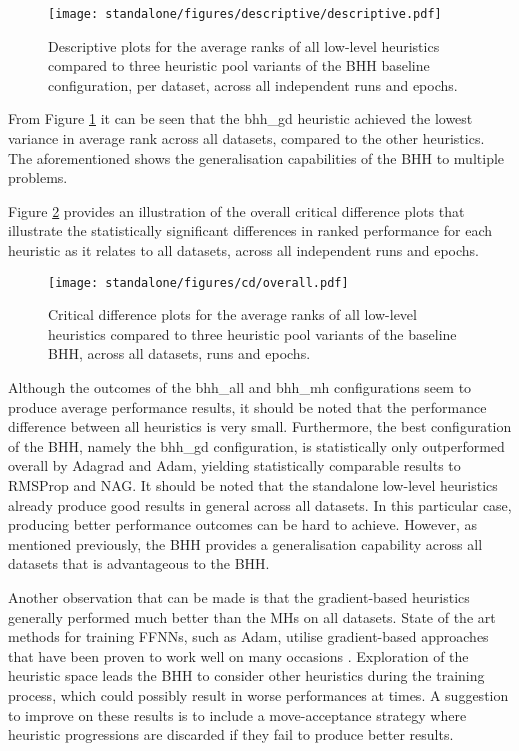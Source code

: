 \begin{figure}[htb]
	\centering
	\texttt{[image: standalone/figures/descriptive/descriptive.pdf]}
	\caption{Descriptive plots for the average ranks of all low-level heuristics compared to three heuristic pool variants of the \acs{BHH} baseline configuration, per dataset, across all independent runs and epochs.}
	\label{fig:results:standalone:descriptive:descriptive}
\end{figure}

From Figure \ref{fig:results:standalone:descriptive:descriptive} it can be seen that the bhh\_gd heuristic achieved the lowest variance in average rank across all datasets, compared to the other heuristics. The aforementioned shows the generalisation capabilities of the \acs{BHH} to multiple problems.

Figure \ref{fig:results:standalone:descriptive:cd} provides an illustration of the overall critical difference plots that illustrate the statistically significant differences in ranked performance for each heuristic as it relates to all datasets, across all independent runs and epochs.

\begin{figure}[htb]
	\centering
	\texttt{[image: standalone/figures/cd/overall.pdf]}
	\caption{Critical difference plots for the average ranks of all low-level heuristics compared to three heuristic pool variants of the baseline \acs{BHH}, across all datasets, runs and epochs.}
	\label{fig:results:standalone:descriptive:cd}
\end{figure}

Although the outcomes of the bhh\_all and bhh\_mh configurations seem to produce average performance results, it should be noted that the performance difference between all heuristics is very small. Furthermore, the best configuration of the \acs{BHH}, namely the bhh\_gd configuration, is statistically only outperformed overall by \acs{Adagrad} and \acs{Adam}, yielding statistically comparable results to \acs{RMSProp} and \acs{NAG}. It should be noted that the standalone low-level heuristics already produce good results in general across all datasets. In this particular case, producing better performance outcomes can be hard to achieve. However, as mentioned previously, the \acs{BHH} provides a generalisation capability across all datasets that is advantageous to the \acs{BHH}.

Another observation that can be made is that the gradient-based heuristics generally performed much better than the \acp{MH} on all datasets. State of the art methods for training \acp{FFNN}, such as \acs{Adam}, utilise gradient-based approaches that have been proven to work well on many occasions \cite{ref:kingma:2014}. Exploration of the heuristic space leads the \acs{BHH} to consider other heuristics during the training process, which could possibly result in worse performances at times. A suggestion to improve on these results is to include a move-acceptance strategy where heuristic progressions are discarded if they fail to produce better results.